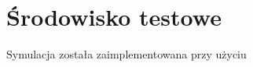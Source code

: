 \chapter{Środowisko testowe}
\label{cha:srodowisko}

Symulacja została zaimplementowana przy użyciu

